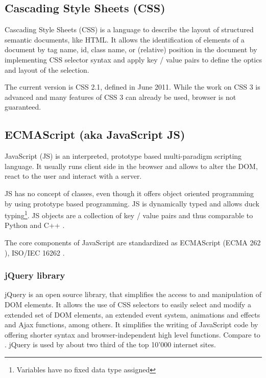 \subsection{Cascading Style Sheets (CSS)}
\label{sec:css}

Cascading Style Sheets (CSS) is a language to describe the layout of structured semantic documents, like HTML.
It allows the identification of elements of a document by tag name, id, class name, or (relative) position in the document by implementing CSS selector syntax and apply key / value pairs to define the optics and layout of the selection.


The current version is CSS 2.1\cite{css_spec}, defined in June 2011. While the work on CSS 3 is advanced\cite{css_stat} and many features of CSS 3 can already be used\cite{caniuse_css}, browser is not guaranteed.


\subsection{ECMAScript (aka JavaScript JS)}
\label{sec:js}
JavaScript (JS) is an interpreted, prototype based multi-paradigm scripting language.
It usually runs client side in the browser and allows to alter the DOM, react to the user and interact with a server.

JS has no concept of classes, even though it offers object oriented programming by using prototype based programming.
JS is dynamically typed and allows duck typing\footnote{Variables have no fixed data type assigned}.
JS objects are a collection of key / value pairs and thus comparable to Python  and C++ .


The core components of JavaScript are standardized as ECMAScript (ECMA 262 \cite{js_std}), ISO/IEC 16262 \cite{js_iso}.


\subsubsection{jQuery library}
\label{sec:jquery}
jQuery is an open source library, that simplifies the access to and manipulation of DOM elements.
It allows the use of CSS selectors to easily select and modify a extended set of DOM elements, an extended event system, animations and effects and Ajax functions, among others.
It simplifies the writing of JavaScript code by offering shorter syntax and browser-independent high level functions.
Compare  to .
jQuery is used by about two third of the top 10'000 internet sites\cite{jquery_usage}.

